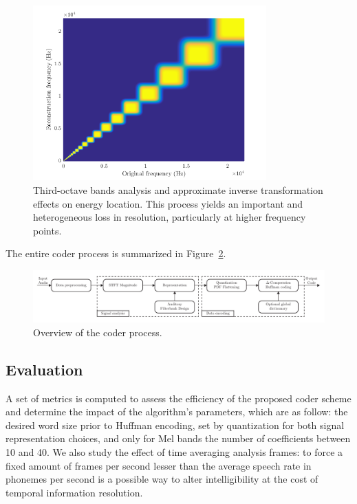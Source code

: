 \documentclass[preprint,12pt]{elsarticle}
\begin{document}
\begin{figure}[htbp]
	\centering
		\includegraphics[width=0.8\textwidth]{freq.png}
	\caption{Third-octave bands analysis and approximate inverse transformation effects on energy location. This process yields an important and heterogeneous loss in resolution, particularly at higher frequency points.}
	\label{fig:freq}
\end{figure}

The entire coder process is summarized in Figure~\ref{fig:scheme}.

\begin{figure}[htbp]
	\centering
		\includegraphics[width=1\textwidth]{scheme.pdf}
	\caption{Overview of the coder process.}
	\label{fig:scheme}
\end{figure}

\subsection{Evaluation}
A set of metrics is computed to assess the efficiency of the proposed coder scheme and determine the impact of the algorithm's parameters, which are as follow: the desired word size prior to Huffman encoding, set by quantization for both signal representation choices, and only for Mel bands the number of coefficients between 10 and 40. We also study the effect of time averaging analysis frames: to force a fixed amount of frames per second lesser than the average speech rate in phonemes per second is a possible way to alter intelligibility at the cost of temporal information resolution.\\
\end{document}
